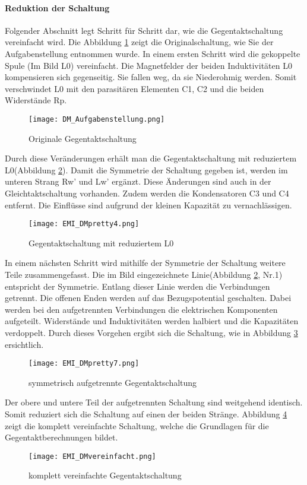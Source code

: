 \paragraph{Reduktion der Schaltung}\label{para:redukGegentakt}
Folgender Abschnitt legt Schritt für Schritt dar, wie die Gegentaktschaltung vereinfacht wird. Die Abbildung \ref{fig:DMSchaltungAufgabenstellung} zeigt die Originalschaltung, wie Sie der Aufgabenstellung entnommen wurde. In einem ersten Schritt wird die gekoppelte Spule (Im Bild L0) vereinfacht. Die Magnetfelder der beiden Induktivitäten L0 kompensieren sich gegenseitig. Sie fallen weg, da sie Niederohmig werden. Somit verschwindet L0 mit den parasitären Elementen C1, C2 und die beiden Widerstände Rp.
\begin{figure}[H]
	\centering
	\texttt{[image: DM\_Aufgabenstellung.png]}
	\caption{Originale Gegentaktschaltung}
	\label{fig:DMSchaltungAufgabenstellung}
\end{figure}
Durch diese Veränderungen erhält man die Gegentaktschaltung mit reduziertem L0(Abbildung \ref{fig:DMSchaltungreduziertL0}). Damit die Symmetrie der Schaltung gegeben ist, werden im unteren Strang Rw’ und Lw’ ergänzt. Diese Änderungen sind auch in der Gleichtaktschaltung vorhanden. Zudem werden die Kondensatoren C3 und C4 entfernt. Die Einflüsse sind aufgrund der kleinen Kapazität zu vernachlässigen. 
\begin{figure}[H]
	\centering
	\texttt{[image: EMI\_DMpretty4.png]}
	\caption{Gegentaktschaltung mit reduziertem L0}
	\label{fig:DMSchaltungreduziertL0}
\end{figure}
In einem nächsten Schritt wird mithilfe der Symmetrie der Schaltung weitere Teile zusammengefasst. Die im Bild eingezeichnete Linie(Abbildung \ref{fig:DMSchaltungreduziertL0}, Nr.1) entspricht der Symmetrie. Entlang dieser Linie werden die Verbindungen getrennt. Die offenen Enden werden auf das Bezugspotential geschalten. Dabei werden bei den aufgetrennten Verbindungen die elektrischen Komponenten aufgeteilt. Widerstände und Induktivitäten werden halbiert und die Kapazitäten verdoppelt. Durch dieses Vorgehen ergibt sich die Schaltung, wie in Abbildung \ref{fig:DMSchaltungSymAufgetrennt} ersichtlich.
\begin{figure}[H]
	\centering
	\texttt{[image: EMI\_DMpretty7.png]}
	\caption{symmetrisch aufgetrennte Gegentaktschaltung}
	\label{fig:DMSchaltungSymAufgetrennt}
\end{figure}
Der obere und untere Teil der aufgetrennten Schaltung sind weitgehend identisch. Somit reduziert sich die Schaltung auf einen der beiden Stränge. Abbildung \ref{fig:DMSchaltungvereinfacht} zeigt die komplett vereinfachte Schaltung, welche die Grundlagen für die Gegentaktberechnungen bildet. 
\begin{figure}[H]
	\centering
	\texttt{[image: EMI\_DMvereinfacht.png]}
	\caption{komplett vereinfachte Gegentaktschaltung}
	\label{fig:DMSchaltungvereinfacht}
\end{figure}


